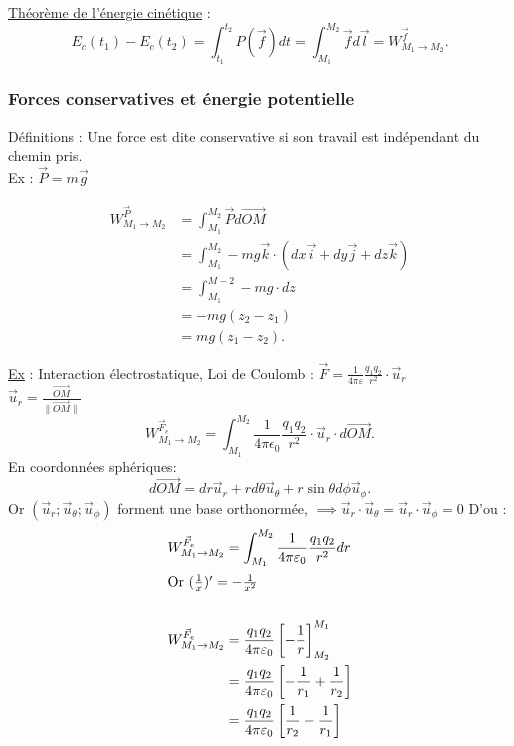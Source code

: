 \documentclass{article}
\begin{document}
\underline{Théorème de l'énergie cinétique} : \\
\[
E_c(t_1)-E_c(t_2) = \int_{t_1}^{t_2}P(\vec{f}) dt = \int_{M_1}^{M_2}\vec{f}d\vec{l} = W_{M_1\to M_2}^{\vec{f}}    
.\] 

\subsubsection{Forces conservatives et énergie potentielle}
Définitions : Une force est dite conservative si son travail est indépendant du chemin pris. \\Ex : \(\vec{P} = m\vec{g}\)

\begin{align*}
    W_{M_1\to M_2}^{\vec{P}} &= \int_{M_1}^{M_2}\vec{P}d\vec{OM}\\
    &= \int_{M_1}^{M_2}-mg\vec{k}\cdot (dx\vec{i}+dy\vec{j}+dz\vec{k})\\
    &= \int_{M_1 }^{M-2} -mg\cdot dz  \\
    &= -mg(z_2 - z_1) \\
    &= mg(z_1-z_2)
.\end{align*}

\underline{Ex} : Interaction électrostatique, Loi de Coulomb : \(\vec{F} = \frac{1}{4\pi\varepsilon} \frac{q_1q_2}{r^2}\cdot \vec{u}_r\)\\
\(\vec{u}_r = \frac{\vec{OM}}{\|\vec{OM}\|}\)\\
\[
W^{\vec{F}_e}_{M_1\to M_2} = \int_{M_1}^{M_2} \frac{1}{4\pi \epsilon_0} \frac{q_1q_2}{r^2}\cdot \vec{u}_r \cdot d\vec{OM}
.\] 
En coordonnées sphériques: 
\[
d\vec{OM} = dr\vec{u}_r + rd\theta \vec{u}_\theta +r\sin\theta d\phi \vec{u}_\phi 
.\] 
Or \((\vec{u}_r ;\vec{u}_\theta;\vec{u}_\phi)\) forment une base orthonormée, \(\implies \vec{u}_r \cdot \vec{u}_\theta = \vec{u}_r \cdot  \vec{u}_\phi  = 0\) 
D'ou : 
\begin{align}
W_{M_1\to M_2}^{\vec{F}_e} &= \int_{M_1}^{M_2} \frac{1}{4\pi \varepsilon_0 } \frac{q_1q_2}{r^2} dr \\
\intertext{Or $(\frac{1}{x})'  = -\frac{1}{x^2}$}\\
W_{M_1\to M_2}^{\vec{F}_e} &= \frac{q_1q_2}{4\pi \varepsilon_0} \left[-\frac{1}{r}\right]_{M_2}^{M_1} \\
&= \frac{q_1q_2}{4\pi \varepsilon_0} \left[-\frac{1}{r_1} + \frac{1}{r_2}\right] \\
&= \frac{q_1q_2}{4\pi \varepsilon_0} \left[\frac{1}{r_2} - \frac{1}{r_1}\right]
\end{align}
\end{document}
